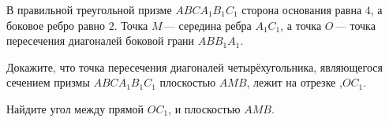 \begin{ex}
	\begin{condition}
		В правильной треугольной призме \( ABCA_1B_1C_1 \) сторона основания равна \( 4 \), а боковое ребро равно \( 2 \). Точка \( M \) --- середина ребра \( A_1C_1 \), а точка \( O \) --- точка пересечения диагоналей боковой грани \( ABB_1A_1 \).
		\begin{enumcols}[label=\asbuk*)]
			\item Докажите, что точка пересечения диагоналей четырёхугольника, являющегося сечением призмы \( ABCA_1B_1C_1 \) плоскостью \( AMB \), лежит на отрезке ,\( OC_1 \).
			\item Найдите угол между прямой \( OC_1 \), и плоскостью \( AMB \).
		\end{enumcols}
	\end{condition}
\end{ex}